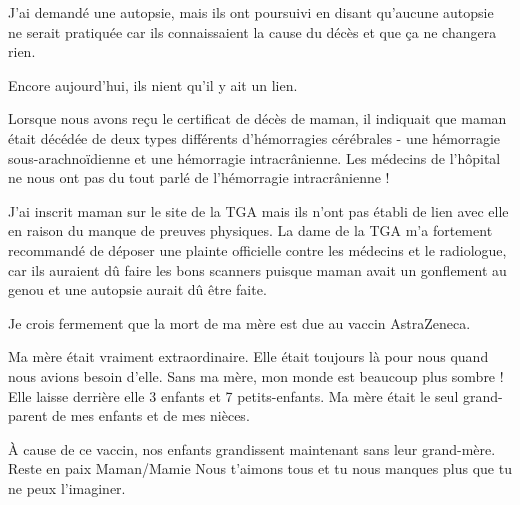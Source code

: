 J'ai demandé une autopsie, mais ils ont poursuivi en disant qu'aucune autopsie
ne serait pratiquée car ils connaissaient la cause du décès et que ça ne
changera rien.

Encore aujourd'hui, ils nient qu'il y ait un lien.

Lorsque nous avons reçu le certificat de décès de maman, il indiquait que maman
était décédée de deux types différents d'hémorragies cérébrales - une hémorragie
sous-arachnoïdienne et une hémorragie intracrânienne. Les médecins de l'hôpital
ne nous ont pas du tout parlé de l'hémorragie intracrânienne !

J'ai inscrit maman sur le site de la TGA mais ils n'ont pas établi de lien avec
elle en raison du manque de preuves physiques. La dame de la TGA m'a fortement
recommandé de déposer une plainte officielle contre les médecins et le
radiologue, car ils auraient dû faire les bons scanners puisque maman avait un
gonflement au genou et une autopsie aurait dû être faite.

Je crois fermement que la mort de ma mère est due au vaccin AstraZeneca.

Ma mère était vraiment extraordinaire. Elle était toujours là pour nous quand
nous avions besoin d'elle. Sans ma mère, mon monde est beaucoup plus sombre !
Elle laisse derrière elle 3 enfants et 7 petits-enfants. Ma mère était le seul
grand-parent de mes enfants et de mes nièces.

À cause de ce vaccin, nos enfants grandissent maintenant sans leur
grand-mère. Reste en paix Maman/Mamie Nous t'aimons tous et tu nous manques plus
que tu ne peux l'imaginer.

